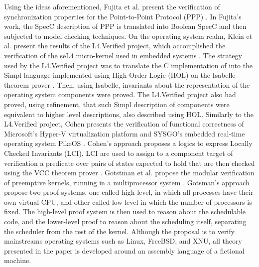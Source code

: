 Using the ideas aforementioned, Fujita et al. present the verification of
synchronization properties for the Point-to-Point Protocol (PPP)
\cite{Fujita:2008}.
In Fujita's work, the SpecC description of PPP is translated into
Boolean SpecC and then subjected to model checking techniques.
% 
%
%
On the operating system realm, Klein et al. present the results of the
L4.Verified project, which accomplished the verification of
the seL4 micro-kernel used in embedded systems \cite{Klein:2009}.
The strategy used by the L4.Verified project was to translate the C
implementation of
into the Simpl language
\cite{Schirmer:2006:PHD}
implemented
using High-Order Logic (HOL) on the Isabelle theorem prover
\cite{Nipkow:2002}. %
Then, using Isabelle, invariants about the representation of the operating
system components were proved.
The L4.Verified project also had proved, using refinement, that such Simpl
description of components were equivalent to higher level descriptions, also
described using HOL.
% 
Similarly to the L4.Verified project, Cohen presents the verification
of functional correctness of Microsoft’s Hyper-V virtualization platform
and SYSGO’s embedded real-time operating system PikeOS
\cite{Cohen:2010}.
Cohen's approach proposes a logics to express Locally Checked Invariants (LCI).
LCI are used to assign to a component target of verification a predicate over
pairs of states expected to hold that are then checked using the VCC theorem
prover \cite{Microsoft:VCC}.
%
Gotstman et al. propose the modular verification of preemptive kernels, running in a
multiprocessor system \cite{Gotsman:2011}.
Gotsman's approach propose two proof systems, one called high-level, in which all
processes have their own virtual CPU, and other called low-level in which the
number of processors is fixed.
The high-level proof system is then used to reason about the schedulable code,
and the lower-level proof to reason about the scheduling itself, separating the
scheduler from the rest of the kernel.
Although the proposal is to verify mainstreams operating systems such as Linux,
FreeBSD, and XNU, all theory presented in the paper is developed around an
assembly language of a fictional machine.


